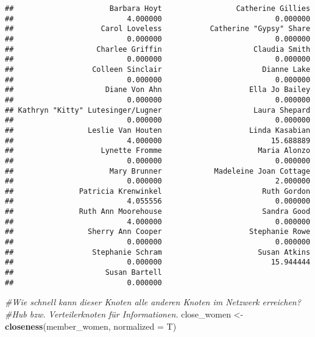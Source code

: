 \documentclass[
]{article}
\newenvironment{Shaded}{\begin{snugshade}}{\end{snugshade}}
\newcommand{\CommentTok}[1]{\textcolor[rgb]{0.56,0.35,0.01}{\textit{#1}}}
\newcommand{\DataTypeTok}[1]{\textcolor[rgb]{0.13,0.29,0.53}{#1}}
\newcommand{\KeywordTok}[1]{\textcolor[rgb]{0.13,0.29,0.53}{\textbf{#1}}}
\newcommand{\NormalTok}[1]{#1}
\newcommand{\StringTok}[1]{\textcolor[rgb]{0.31,0.60,0.02}{#1}}
\begin{document}
\begin{verbatim}
##                      Barbara Hoyt                 Catherine Gillies 
##                          4.000000                          0.000000 
##                    Carol Loveless           Catherine "Gypsy" Share 
##                          0.000000                          0.000000 
##                   Charlee Griffin                     Claudia Smith 
##                          0.000000                          0.000000 
##                  Colleen Sinclair                       Dianne Lake 
##                          0.000000                          0.000000 
##                     Diane Von Ahn                    Ella Jo Bailey 
##                          0.000000                          0.000000 
## Kathryn "Kitty" Lutesinger/Lugner                     Laura Shepard 
##                          0.000000                          0.000000 
##                 Leslie Van Houten                    Linda Kasabian 
##                          4.000000                         15.688889 
##                    Lynette Fromme                      Maria Alonzo 
##                          0.000000                          0.000000 
##                      Mary Brunner            Madeleine Joan Cottage 
##                          0.000000                          2.000000 
##               Patricia Krenwinkel                       Ruth Gordon 
##                          4.055556                          0.000000 
##               Ruth Ann Moorehouse                       Sandra Good 
##                          4.000000                          0.000000 
##                 Sherry Ann Cooper                    Stephanie Rowe 
##                          0.000000                          0.000000 
##                  Stephanie Schram                      Susan Atkins 
##                          0.000000                         15.944444 
##                     Susan Bartell 
##                          0.000000
\end{verbatim}

\begin{Shaded}
\begin{Highlighting}[]
\CommentTok{#Wie schnell kann dieser Knoten alle anderen Knoten im Netzwerk erreichen? }
\CommentTok{#Hub bzw. Verteilerknoten für Informationen.}
\NormalTok{close_women <-}\StringTok{ }\KeywordTok{closeness}\NormalTok{(member_women, }\DataTypeTok{normalized =}\NormalTok{ T)}
\end{Highlighting}
\end{Shaded}
\end{document}
